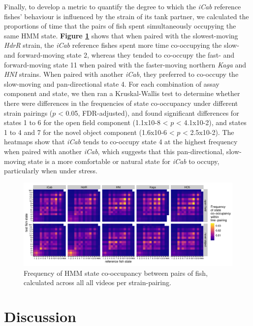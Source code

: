 \documentclass[
]{book}
\begin{document}
Finally, to develop a metric to quantify the degree to which the \emph{iCab} reference fishes' behaviour is influenced by the strain of its tank partner, we calculated the proportions of time that the pairs of fish spent simultaneously occupying the same HMM state. \textbf{Figure \ref{fig:pilot-cooc-heat}} shows that when paired with the slowest-moving \emph{HdrR} strain, the \emph{iCab} reference fishes spent more time co-occupying the slow- and forward-moving state 2, whereas they tended to co-occupy the fast- and forward-moving state 11 when paired with the faster-moving northern \emph{Kaga} and \emph{HNI} strains. When paired with another \emph{iCab}, they preferred to co-occupy the slow-moving and pan-directional state 4. For each combination of assay component and state, we then ran a Kruskal-Wallis test to determine whether there were differences in the frequencies of state co-occupancy under different strain pairings (\(p\) \textless{} 0.05, FDR-adjusted), and found significant differences for states 1 to 6 for the open field component (1.1x10-8 \textless{} \(p\) \textless{} 4.1x10-2), and states 1 to 4 and 7 for the novel object component (1.6x10-6 \textless{} \(p\) \textless{} 2.5x10-2). The heatmaps show that \emph{iCab} tends to co-occupy state 4 at the highest frequency when paired with another \emph{iCab}, which suggests that this pan-directional, slow-moving state is a more comfortable or natural state for \emph{iCab} to occupy, particularly when under stress.



\begin{figure}
\includegraphics[width=1\linewidth]{figs/pilot/0.08_14_cooc_heatmap} \caption{Frequency of HMM state co-occupancy between pairs of fish, calculated across all all videos per strain-pairing.}\label{fig:pilot-cooc-heat}
\end{figure}

\hypertarget{discussion}{%
\section{Discussion}\label{discussion}}
\end{document}

